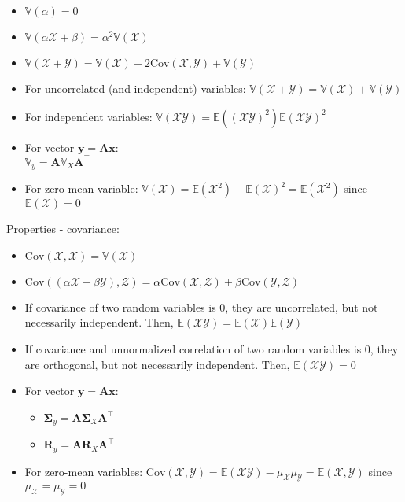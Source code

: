 \begin{multicols}{2}
\begin{itemize}
    \item $\mathbb{V}(\alpha)=0$
    \item $\mathbb{V}(\alpha\mathcal{X}+\beta)=\alpha^2\mathbb{V}(\mathcal{X})$
    \item $\mathbb{V}(\mathcal{X} + \mathcal{Y})=\mathbb{V}(\mathcal{X})+2\textrm{Cov}(\mathcal{X},\mathcal{Y})+\mathbb{V}(\mathcal{Y})$
    \item For uncorrelated (and independent) variables: $\mathbb{V}(\mathcal{X} + \mathcal{Y})=\mathbb{V}(\mathcal{X})+\mathbb{V}(\mathcal{Y})$
    \item For independent variables: $\mathbb{V}(\mathcal{X}\mathcal{Y})=\mathbb{E}((\mathcal{X}\mathcal{Y})^2)\mathbb{E}(\mathcal{X}\mathcal{Y})^2$
    \item For vector $\boldsymbol{y} = \boldsymbol{A}\boldsymbol{x}$:\\ $\mathbb{V}_y = \boldsymbol{A}\mathbb{V}_X\boldsymbol{A}^\intercal$
    \item For zero-mean variable: $\mathbb{V}(\mathcal{X})= \mathbb{E}(\mathcal{X}^2) - \mathbb{E}(\mathcal{X})^2 = \mathbb{E}(\mathcal{X}^2)$ since $\mathbb{E}(\mathcal{X}) = 0$
\end{itemize}
\end{multicols}
Properties - covariance:
\begin{itemize}
    \item $\textrm{Cov}(\mathcal{X},\mathcal{X}) = \mathbb{V}(\mathcal{X})$
    \item $\textrm{Cov}((\alpha \mathcal{X} + \beta \mathcal{Y}),\mathcal{Z}) = \alpha \textrm{Cov}(\mathcal{X},\mathcal{Z}) + \beta \textrm{Cov}(\mathcal{Y},\mathcal{Z})$
    \item If covariance of two random variables is 0, they are uncorrelated, but not necessarily independent. Then, $\mathbb{E}(\mathcal{X}\mathcal{Y})=\mathbb{E}(\mathcal{X})\mathbb{E}(\mathcal{Y})$
    \item If covariance and unnormalized correlation of two random variables is 0, they are orthogonal, but not necessarily independent. Then, $\mathbb{E}(\mathcal{X}\mathcal{Y}) = 0$
    \item For vector $\boldsymbol{y} = \boldsymbol{A}\boldsymbol{x}$:
        \begin{itemize}
            \item $\boldsymbol{\Sigma}_y = \boldsymbol{A}\boldsymbol{\Sigma}_X\boldsymbol{A}^\intercal$
            \item $\boldsymbol{R}_y = \boldsymbol{A}\boldsymbol{R}_X\boldsymbol{A}^\intercal$
        \end{itemize}
    \item For zero-mean variables: $\textrm{Cov}(\mathcal{X},\mathcal{Y})= \mathbb{E}(\mathcal{X}\mathcal{Y}) - \mu_{\mathcal{X}} \mu_{\mathcal{Y}} = \mathbb{E}(\mathcal{X},\mathcal{Y})$ since $\mu_{\mathcal{X}} = \mu_{\mathcal{Y}} = 0$
\end{itemize}
